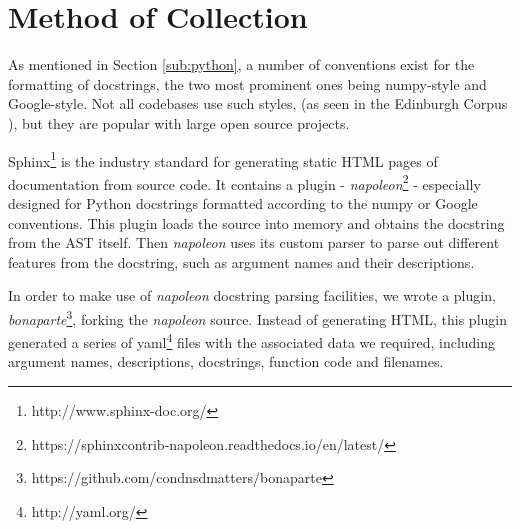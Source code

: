 \section{Method of Collection} %
\label{sec:method_of_collection}

As mentioned in Section \ref{sub:python}, a number of conventions exist for the formatting of docstrings, the two most prominent ones being numpy-style and Google-style.
Not all codebases use such styles, (as seen in the Edinburgh Corpus \citep{barone_parallel_2017}), but they are popular with large open source projects. 

Sphinx\footnote{http://www.sphinx-doc.org/} is the industry standard for generating static HTML pages of documentation from source code. It contains a plugin - \textit{napoleon}\footnote{https://sphinxcontrib-napoleon.readthedocs.io/en/latest/} - especially designed for Python docstrings formatted according to the numpy or Google conventions. 
This plugin loads the source into memory and obtains the docstring from the AST itself.
Then \textit{napoleon} uses its custom parser to parse out different features from the docstring, such as argument names and their descriptions.

In order to make use of \textit{napoleon} docstring parsing facilities, we wrote a plugin, \textit{bonaparte}\footnote{https://github.com/condnsdmatters/bonaparte}, forking the \textit{napoleon} source. 
Instead of generating HTML, this plugin generated a series of yaml\footnote{http://yaml.org/} files with the associated data we required, including argument names, descriptions, docstrings, function code and filenames.
 

